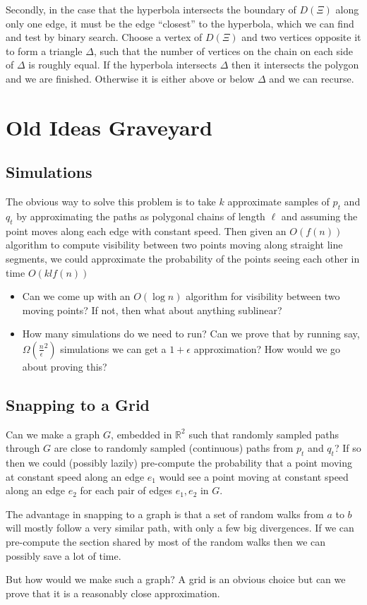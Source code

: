\documentclass{article}
\begin{document}
Secondly, in the case that the hyperbola intersects the boundary of $D(\Xi)$ along only one edge, it must be the edge ``closest'' to the hyperbola, which we can find and test by binary search. Choose a vertex of $D(\Xi)$ and two vertices opposite it to form a triangle $\Delta$, such that the number of vertices on the chain on each side of $\Delta$ is roughly equal. If the hyperbola intersects $\Delta$ then it intersects the polygon and we are finished. Otherwise it is either above or below $\Delta$ and we can recurse.

\newpage
\section{Old Ideas Graveyard}
\subsection{Simulations}
The obvious way to solve this problem is to take $k$ approximate samples of $p_t$ and $q_t$ by approximating the paths as polygonal chains of length $\ell$ and assuming the point moves along each edge with constant speed. Then given an $O(f(n))$ algorithm to compute visibility between two points moving along straight line segments, we could approximate the probability of the points seeing each other in time $O(k l f(n))$

\begin{itemize}
\item Can we come up with an $O(\log n)$ algorithm for visibility between two moving points? If not, then what about anything sublinear?
\item How many simulations do we need to run? Can we prove that by running say, $\Omega(\frac{n}{\epsilon}^2)$ simulations we can get a $1+\epsilon$ approximation? How would we go about proving this?
\end{itemize}

\subsection{Snapping to a Grid}
Can we make a graph $G$, embedded in $\mathbb{R}^2$ such that randomly sampled paths through $G$ are close to randomly sampled (continuous) paths from $p_t$ and $q_t$? If so then we could (possibly lazily) pre-compute the probability that a point moving at constant speed along an edge $e_1$ would see a point moving at constant speed along an edge $e_2$ for each pair of edges $e_1, e_2$ in $G$.

The advantage in snapping to a graph is that a set of random walks from $a$ to $b$ will mostly follow a very similar path, with only a few big divergences. If we can pre-compute the section shared by most of the random walks then we can possibly save a lot of time.

But how would we make such a graph? A grid is an obvious choice but can we prove that it is a reasonably close approximation.



\end{document}
